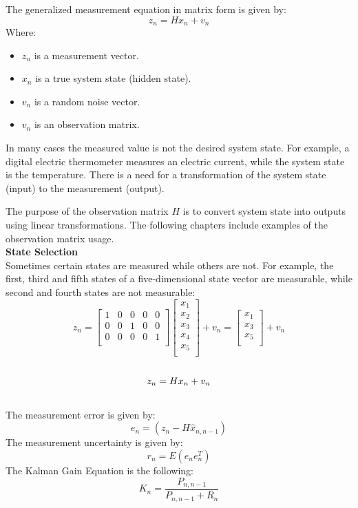 \documentclass[eng]{ajceam-class}
\begin{document}
The generalized measurement equation in matrix form is given by:
$$
{z}_{n} = {H}{x}_{n} + {v}_{n} 
$$
Where:
\begin{itemize}
\item ${z}_{n}$	is a measurement vector.
\item ${x}_{n}$	is a true system state (hidden state).
\item ${v}_{n}$	is a random noise vector.
\item ${v}_{n}$	is an observation matrix.
\end{itemize}
In many cases the measured value is not the desired system state. For example, a digital electric thermometer measures an electric current, while the system state is the temperature. There is a need for a transformation of the system state (input) to the measurement (output).

The purpose of the observation matrix ${H}$ is to convert system state into outputs using linear transformations. The following chapters include examples of the observation matrix usage.\\
\textbf{State Selection}\\
Sometimes certain states are measured while others are not. For example, the first, third and fifth states of a five-dimensional state vector are measurable, while second and fourth states are not measurable:
$$
{z}_{n}=
\left[\begin{array}{ccccc}
1 & 0 & 0 & 0 & 0   \\
0 & 0 & 1 & 0 & 0   \\
0 & 0 & 0 & 0 & 1   \\
\end{array}\right]
\left[\begin{array}{l}
{x}_{1} \\
{x}_{2} \\
{x}_{3} \\
{x}_{4} \\
{x}_{5} \\
\end{array}\right]+
{v}_{n} = \left[\begin{array}{l}
{x}_{1} \\
{x}_{3} \\
{x}_{5} \\
\end{array}\right]+
{v}_{n}
$$
\\
$$
{z}_{n} = {H}{x}_{n} + {v}_{n} \\
$$
\\
The measurement error is given by:
$$
{e}_{n} = ({z}_{n} - H{\hat{x}_{n,n-1}})
$$
The measurement uncertainty is given by:
$$
{r}_{n}=E({e}_{n}{e}_{n}^T)
$$
The Kalman Gain Equation is the following:
\begin{equation} \label{ec-1}
K_{n}=\frac{P_{n, n-1}}{P_{n, n-1}+R_{n}} 
\end{equation}
\end{document}
